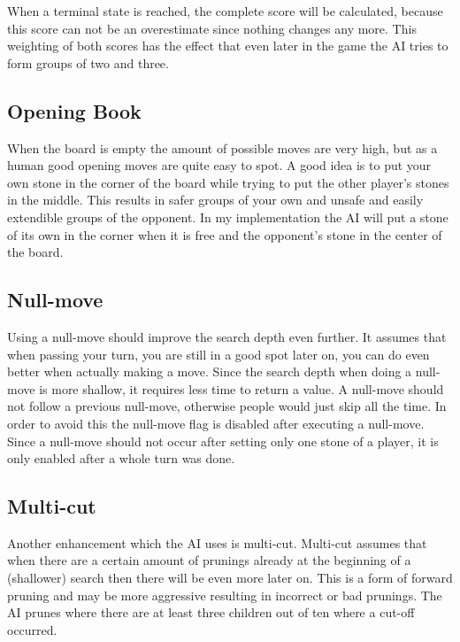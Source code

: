 \documentclass[a4paper]{article}
\begin{document}
When a terminal state is reached, the complete score will be calculated, because this score can not be an overestimate since nothing changes any more. This weighting of both scores has the effect that even later in the game the AI tries to form groups of two and three.

\subsection{Opening Book}
When the board is empty the amount of possible moves are very high, but as a human good opening moves are quite easy to spot. A good idea is to put your own stone in the corner of the board while trying to put the other player's stones in the middle. This results in safer groups of your own and unsafe and easily extendible groups of the opponent.
In my implementation the AI will put a stone of its own in the corner when it is free and the opponent's stone in the center of the board.

\subsection{Null-move}
Using a null-move should improve the search depth even further. It assumes that when passing your turn, you are still in a good spot later on, you can do even better when actually making a move. Since the search depth when doing a null-move is more shallow, it requires less time to return a value. A null-move should not follow a previous null-move, otherwise people would just skip all the time. In order to avoid this the null-move flag is disabled after executing a null-move. Since a null-move should not occur after setting only one stone of a player, it is only enabled after a whole turn was done.

\subsection{Multi-cut}
Another enhancement which the AI uses is multi-cut. Multi-cut assumes that when there are a certain amount of prunings already at the beginning of a (shallower) search then there will be even more later on. This is a form of forward pruning and may be more aggressive resulting in incorrect or bad prunings. The AI prunes where there are at least three children out of ten where a cut-off occurred. 
\end{document}
